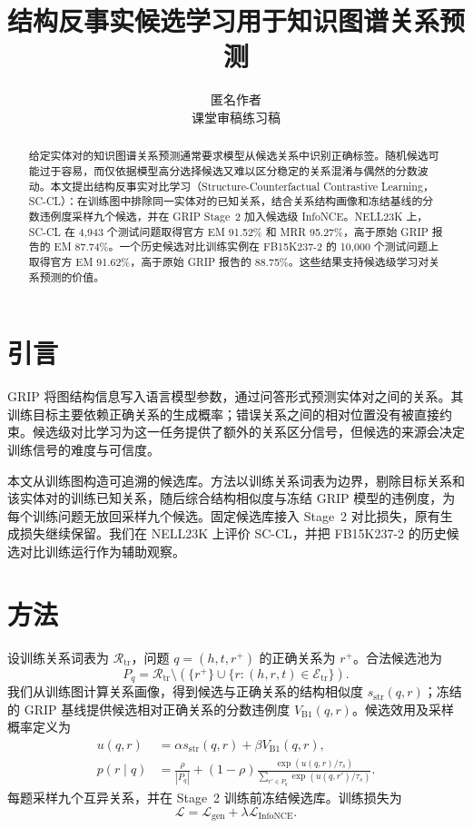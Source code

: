 \documentclass{article}
\title{结构反事实候选学习用于知识图谱关系预测}
\author{匿名作者\\课堂审稿练习稿}
\newcommand{\scc}{\textsc{SC-CL}}
\begin{document}
\maketitle
\begin{center}
\small{}
\end{center}

\begin{abstract}
给定实体对的知识图谱关系预测通常要求模型从候选关系中识别正确标签。随机候选可能过于容易，而仅依据模型高分选择候选又难以区分稳定的关系混淆与偶然的分数波动。本文提出结构反事实对比学习（Structure-Counterfactual Contrastive Learning，\scc）：在训练图中排除同一实体对的已知关系，结合关系结构画像和冻结基线的分数违例度采样九个候选，并在 GRIP Stage~2 加入候选级 InfoNCE。NELL23K 上，\scc{} 在 4,943 个测试问题取得官方 EM 91.52\% 和 MRR 95.27\%，高于原始 GRIP 报告的 EM 87.74\%。一个历史候选对比训练实例在 FB15K237-2 的 10,000 个测试问题上取得官方 EM 91.62\%，高于原始 GRIP 报告的 88.75\%。这些结果支持候选级学习对关系预测的价值。
\end{abstract}

\section{引言}
GRIP 将图结构信息写入语言模型参数，通过问答形式预测实体对之间的关系\cite{feng2026grip}。其训练目标主要依赖正确关系的生成概率；错误关系之间的相对位置没有被直接约束。候选级对比学习为这一任务提供了额外的关系区分信号，但候选的来源会决定训练信号的难度与可信度。

本文从训练图构造可追溯的候选库。方法以训练关系词表为边界，剔除目标关系和该实体对的训练已知关系，随后综合结构相似度与冻结 GRIP 模型的违例度，为每个训练问题无放回采样九个候选。固定候选库接入 Stage~2 对比损失，原有生成损失继续保留。我们在 NELL23K 上评价 \scc{}，并把 FB15K237-2 的历史候选对比训练运行作为辅助观察。

\section{方法}
设训练关系词表为 $\mathcal R_{\mathrm{tr}}$，问题 $q=(h,t,r^+)$ 的正确关系为 $r^+$。合法候选池为
\begin{equation}
P_q=\mathcal R_{\mathrm{tr}}\setminus\left(\{r^+\}\cup\{r:(h,r,t)\in\mathcal E_{\mathrm{tr}}\}\right).
\end{equation}
我们从训练图计算关系画像，得到候选与正确关系的结构相似度 $s_{\mathrm{str}}(q,r)$；冻结的 GRIP 基线提供候选相对正确关系的分数违例度 $V_{\mathrm{B1}}(q,r)$。候选效用及采样概率定义为
\begin{align}
u(q,r)&=\alpha s_{\mathrm{str}}(q,r)+\beta V_{\mathrm{B1}}(q,r),\\
p(r\mid q)&=\frac{\rho}{|P_q|}+(1-\rho)\frac{\exp(u(q,r)/\tau_s)}{\sum_{r'\in P_q}\exp(u(q,r')/\tau_s)}.
\end{align}
每题采样九个互异关系，并在 Stage~2 训练前冻结候选库。训练损失为
\begin{equation}
\mathcal L=\mathcal L_{\mathrm{gen}}+\lambda\mathcal L_{\mathrm{InfoNCE}}.
\end{equation}
\end{document}

